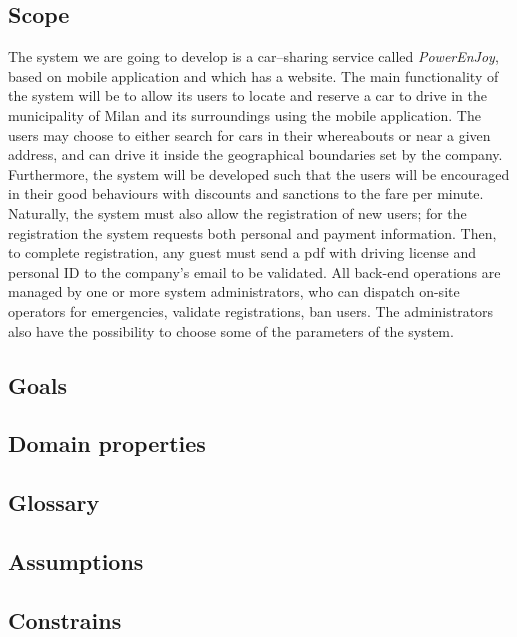 \documentclass[12pt, a4paper]{article}
\begin{document}
		\subsection{Scope}
			The system we are going to develop is a car–sharing service called \textit{PowerEnJoy}, based on mobile application and which has a website. 
			The main functionality of the system will be to allow its users to locate and reserve a car to drive in the municipality of Milan and its surroundings using the mobile application. The users may choose to either search for cars in their whereabouts or near a given address, and can drive it inside the geographical boundaries set by the company. 
			Furthermore, the system will be developed such that the users will be encouraged in their good behaviours with discounts and sanctions to the fare per minute.
			Naturally, the system must also allow the registration of new users; for the registration the system requests both personal and payment information. Then, to complete registration, any guest must send a pdf with driving license and personal ID to the company's email to be validated. 
			All back-end operations are managed by one or more system administrators, who can dispatch on-site operators for emergencies, validate registrations, ban users. The administrators also have the possibility to choose some of the parameters of the system. 
			
			
		\subsection{Goals}
		

		\subsection{Domain properties}
		

		\subsection{Glossary}
		

		\subsection{Assumptions}
		

		\subsection{Constrains}
\end{document}
